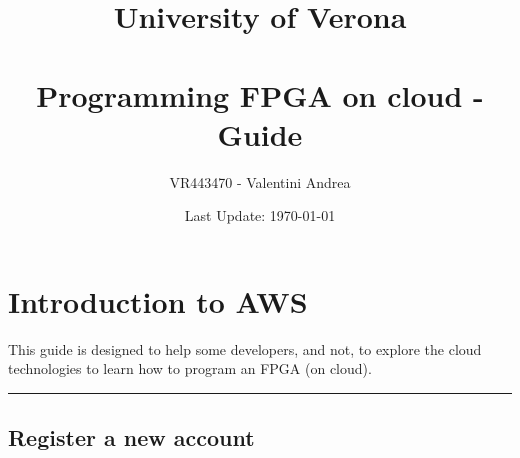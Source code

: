 \documentclass[a4paper]{article}
\newcommand{\longline}{\noindent\rule{\textwidth}{0.4pt}}
\begin{document}
    \author{VR443470 - Valentini Andrea}
    \title{University of Verona \\
    \:\\
    Programming FPGA on cloud - Guide}
    \date{Last Update: \today}

    \maketitle

    \newpage

    \tableofcontents

    \newpage

    \section{Introduction to AWS}

    This guide is designed to help some developers, and not, to explore the cloud technologies to learn how to program an FPGA (on cloud).

    \longline
    
    \subsection{Register a new account}
\end{document}
